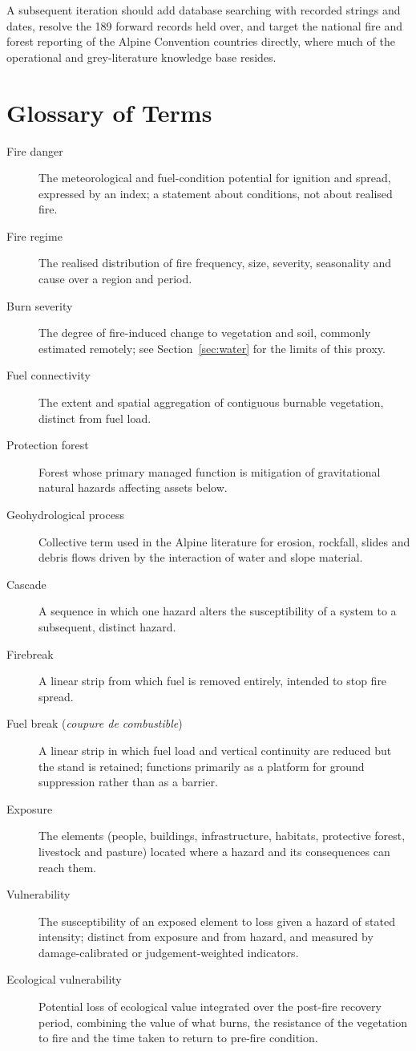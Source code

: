\documentclass[11pt,a4paper]{article}
\begin{document}
A subsequent iteration should add database searching with recorded strings and dates, resolve the 189 forward records held over, and target the national fire and forest reporting of the Alpine Convention countries directly, where much of the operational and grey-literature knowledge base resides.

\section{Glossary of Terms}

\begin{description}
    \item[Fire danger] The meteorological and fuel-condition potential for ignition and spread, expressed by an index; a statement about conditions, not about realised fire.
    \item[Fire regime] The realised distribution of fire frequency, size, severity, seasonality and cause over a region and period.
    \item[Burn severity] The degree of fire-induced change to vegetation and soil, commonly estimated remotely; see Section~\ref{sec:water} for the limits of this proxy.
    \item[Fuel connectivity] The extent and spatial aggregation of contiguous burnable vegetation, distinct from fuel load.
    \item[Protection forest] Forest whose primary managed function is mitigation of gravitational natural hazards affecting assets below.
    \item[Geohydrological process] Collective term used in the Alpine literature for erosion, rockfall, slides and debris flows driven by the interaction of water and slope material.
    \item[Cascade] A sequence in which one hazard alters the susceptibility of a system to a subsequent, distinct hazard.
    \item[Firebreak] A linear strip from which fuel is removed entirely, intended to stop fire spread.
    \item[Fuel break (\emph{coupure de combustible})] A linear strip in which fuel load and vertical continuity are reduced but the stand is retained; functions primarily as a platform for ground suppression rather than as a barrier.
    \item[Exposure] The elements (people, buildings, infrastructure, habitats, protective forest, livestock and pasture) located where a hazard and its consequences can reach them.
    \item[Vulnerability] The susceptibility of an exposed element to loss given a hazard of stated intensity; distinct from exposure and from hazard, and measured by damage-calibrated or judgement-weighted indicators.
    \item[Ecological vulnerability] Potential loss of ecological value integrated over the post-fire recovery period, combining the value of what burns, the resistance of the vegetation to fire and the time taken to return to pre-fire condition.
\end{description}




\end{document}

